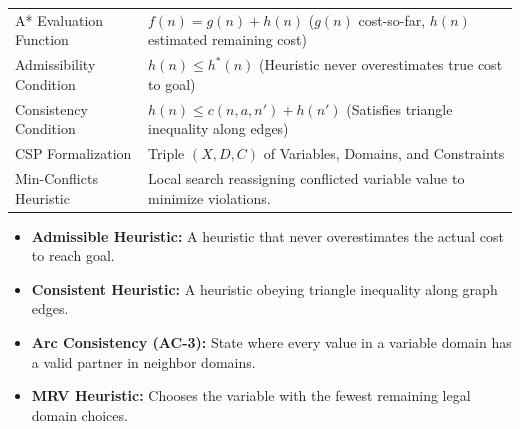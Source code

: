 \documentclass[12pt,a4paper]{article}
\renewcommand{\arraystretch}{1.45}
\begin{document}
\begin{tcolorbox}[formulabox, title={\textbf{Key Concepts and Metrics at a Glance}}]
\renewcommand{\arraystretch}{1.35}
\begin{tabularx}{\linewidth}{B{4.5cm} X}
A* Evaluation Function & $f(n) = g(n) + h(n)$ \quad ($g(n)$ cost-so-far, $h(n)$ estimated remaining cost) \\[4pt]
Admissibility Condition & $h(n) \le h^*(n)$ \quad (Heuristic never overestimates true cost to goal) \\[4pt]
Consistency Condition & $h(n) \le c(n, a, n') + h(n')$ \quad (Satisfies triangle inequality along edges) \\[4pt]
CSP Formalization & Triple $(X, D, C)$ of Variables, Domains, and Constraints \\[4pt]
Min-Conflicts Heuristic & Local search reassigning conflicted variable value to minimize violations. \\
\end{tabularx}
\end{tcolorbox}

\begin{tcolorbox}[defbox, title={\textbf{One-Line Definitions}}]
  \begin{itemize}[leftmargin=*, noitemsep]
    \item \textbf{Admissible Heuristic:} A heuristic that never overestimates the actual cost to reach goal.
    \item \textbf{Consistent Heuristic:} A heuristic obeying triangle inequality along graph edges.
    \item \textbf{Arc Consistency (AC-3):} State where every value in a variable domain has a valid partner in neighbor domains.
    \item \textbf{MRV Heuristic:} Chooses the variable with the fewest remaining legal domain choices.
  \end{itemize}
\end{tcolorbox}
\end{document}

